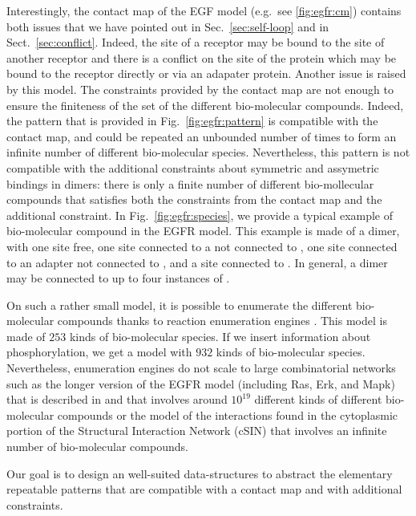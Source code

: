 \documentclass{entcs}
\begin{document}
Interestingly, the contact map of the EGF model (e.g.~see \ref{fig:egfr:cm})
contains both issues that we have pointed out in Sec.~\ref{sec:self-loop} and in Sect.~\ref{sec:conflict}. Indeed, the site  of a receptor may be bound to the site  of another receptor and there is a conflict on the site  of the protein  which may be bound to the receptor directly
or via an adapater protein. Another issue is raised by this model.
The constraints provided by the contact map are not enough to ensure the finiteness of the set of the different bio-molecular compounds. Indeed,
the pattern that is provided in Fig.~\ref{fig:egfr:pattern} is compatible with the contact map, and could be repeated an unbounded number of times to form an infinite number of different bio-molecular species. Nevertheless, this pattern is not compatible with the additional constraints about symmetric and assymetric bindings in dimers: there is only a finite number of different bio-mollecular compounds that satisfies both
the constraints from the contact map and the additional constraint.
In Fig.~\ref{fig:egfr:species}, we provide a typical example of bio-molecular compound in the EGFR model. This example is made of a dimer, with one site  free, one site  connected to a  not connected to , one site  connected to an adapter not connected to , and a site  connected to . In general, a dimer may be connected to up to four instances of .

On such a rather small model, it is possible to enumerate the different bio-molecular compounds thanks to reaction enumeration engines  \cite{BNGL,KaDe}. This model is made of $253$ kinds of bio-molecular species.
If we insert information about phosphorylation, we get a model
with $932$ kinds of bio-molecular species. Nevertheless, enumeration engines do not scale to large combinatorial networks such as the longer version of the EGFR model (including Ras, Erk, and Mapk) that is described in \cite{DanosEtAl-CONCUR07} and that involves around $10^19$ different kinds of different bio-molecular compounds \cite{DanosEtAl-VMCAI08} or the model of the interactions found in the cytoplasmic portion of the Structural Interaction Network (cSIN) \cite{Deeds-et-al-plosone2012,Kim} that involves an infinite number of bio-molecular compounds.

Our goal is to design an well-suited data-structures to abstract the elementary repeatable patterns that are compatible with a contact map and with additional constraints.
\end{document}
